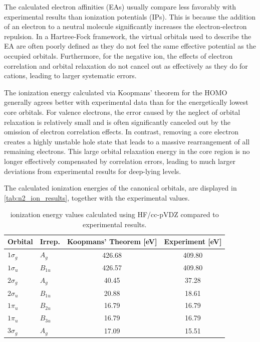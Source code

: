 \documentclass[a4paper,12pt]{scrartcl}
\begin{document}
The calculated electron affinities (EAs) usually compare less favorably with experimental results than ionization potentials (IPs). This is because the addition of an electron to a neutral molecule significantly increases the electron-electron repulsion. In a Hartree-Fock framework, the virtual orbitals used to describe the EA are often poorly defined as they do not feel the same effective potential as the occupied orbitals. Furthermore, for the negative ion, the effects of electron correlation and orbital relaxation do not cancel out as effectively as they do for cations, leading to larger systematic errors.

The ionization energy calculated via Koopmans' theorem for the HOMO generally agrees better with experimental data than for the energetically lowest core orbitals. For valence electrons, the error caused by the neglect of orbital relaxation is relatively small and is often significantly canceled out by the omission of electron correlation effects. In contrast, removing a core electron creates a highly unstable hole state that leads to a massive rearrangement of all remaining electrons. This large orbital relaxation energy in the core region is no longer effectively compensated by correlation errors, leading to much larger deviations from experimental results for deep-lying levels.

The calculated ionization energies of the canonical orbitals, are displayed in \autoref{tab:n2_ion_results}, together with the experimental values.

\begin{table}[H]
\centering
\caption{ ionization energy values calculated using HF/cc-pVDZ compared to experimental results.}
\label{tab:n2_ion_results}
\begin{tabular}{llcc}
\hline
Orbital & Irrep. & Koopmans' Theorem [eV] & Experiment [eV] \\ \hline
$1\sigma_{g}$    & $A_{g}$         & 426.68                          & 409.80                   \\
$1\sigma_{u}$    & $B_{1u}$        & 426.57                          & 409.80                   \\
$2\sigma_{g}$    & $A_{g}$         & 40.45                           & 37.28                    \\
$2\sigma_{u}$    & $B_{1u}$        & 20.88                           & 18.61                    \\
$1\pi_{u}$       & $B_{2u}$        & 16.79                           & 16.79                    \\
$1\pi_{u}$       & $B_{3u}$        & 16.79                           & 16.79                    \\
$3\sigma_{g}$    & $A_{g}$         & 17.09                           & 15.51                    \\ \hline
\end{tabular}
\end{table}
\end{document}

